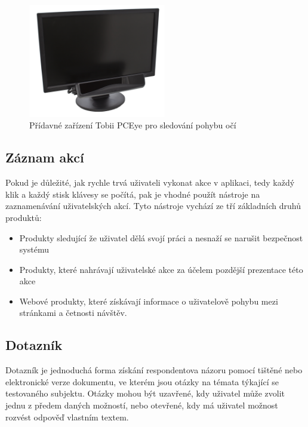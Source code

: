 \begin{figure}[htb]
\begin{center}
\includegraphics[width=60mm]{./pictures/tobii_image_pceye_mounted_front_rgb.jpg}
\caption{Přídavné zařízení Tobii PCEye pro sledování pohybu očí}
\label{fig:tobii}
\end{center}
\end{figure}

\subsection{Záznam akcí}
Pokud je důležité, jak rychle trvá uživateli vykonat akce v aplikaci, tedy každý klik a každý stisk klávesy se počítá, pak je vhodné použít nástroje na zaznamenávání uživatelských akcí\cite{stone2005user}. Tyto nástroje vychází ze tří základních druhů produktů\cite{stone2005user}:
\begin{itemize}
\item Produkty sledující že uživatel dělá svojí práci a nesnaží se narušit bezpečnost systému
\item Produkty, které nahrávají uživatelské akce za účelem pozdější prezentace této akce
\item Webové produkty, které získávají informace o uživatelově pohybu mezi stránkami a četnosti návštěv.
\end{itemize}

\subsection{Dotazník}
Dotazník je jednoduchá forma získání respondentova názoru pomocí tištěné nebo elektronické verze dokumentu, ve kterém jsou otázky na témata týkající se testovaného subjektu. Otázky mohou být uzavřené, kdy uživatel může zvolit jednu z předem daných možností, nebo otevřené, kdy má uživatel možnost rozvést odpověď vlastním textem.

